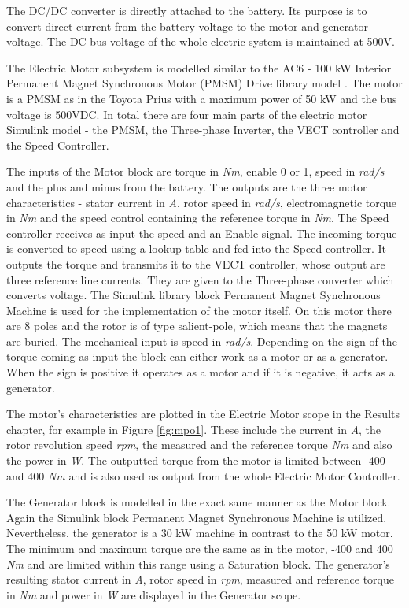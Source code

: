 The DC/DC converter is directly attached to the battery. Its purpose is to convert direct current from the battery voltage to the motor and generator voltage. The DC bus voltage of the whole electric system is maintained at 500V. 

The Electric Motor subsystem is modelled similar to the AC6 - 100 kW Interior Permanent Magnet Synchronous Motor (PMSM) Drive library model \citep{ac6Matlab}. The motor is a PMSM as in the Toyota Prius with a maximum power of 50 kW and the bus voltage is 500VDC. In total there are four main parts of the electric motor Simulink model - the PMSM, the Three-phase Inverter, the VECT controller and the Speed Controller. 

The inputs of the Motor block are torque in \textit{Nm}, enable 0 or 1, speed in \textit{rad/s} and the plus and minus from the battery. The outputs are the three motor characteristics - stator current in \textit{A}, rotor speed in \textit{rad/s}, electromagnetic torque in \textit{Nm} and the speed control containing the reference torque in \textit{Nm}. The Speed controller receives as input the speed and an Enable signal. The incoming torque is converted to speed using a lookup table and fed into the Speed controller. It outputs the torque and transmits it to the VECT controller, whose output are three reference line currents. They are given to the Three-phase converter which converts voltage. The Simulink library block Permanent Magnet Synchronous Machine \citep{pmsmMatlab} is used for the implementation of the motor itself. On this motor there are 8 poles and the rotor is of type salient-pole, which means that the magnets are buried. The mechanical input is speed in \textit{rad/s}. Depending on the sign of the torque coming as input the block can either work as a motor or as a generator. When the sign is positive it operates as a motor and if it is negative, it acts as a generator. 

The motor's characteristics are plotted in the Electric Motor scope in the Results chapter, for example in Figure \ref{fig:mpo1}. These include the current in \textit{A}, the rotor revolution speed \textit{rpm}, the measured and the reference torque \textit{Nm} and also the power in \textit{W}. The outputted torque from the motor is limited between -400 and 400 \textit{Nm} and is also used as output from the whole Electric Motor Controller.

The Generator block is modelled in the exact same manner as the Motor block. Again the Simulink block Permanent Magnet Synchronous Machine \citep{pmsmMatlab} is utilized. Nevertheless, the generator is a 30 kW machine in contrast to the 50 kW motor. The minimum and maximum torque are the same as in the motor, -400 and 400 \textit{Nm} and are limited within this range using a Saturation block. The generator's resulting stator current in \textit{A}, rotor speed in \textit{rpm}, measured and reference torque in \textit{Nm} and power in \textit{W} are displayed in the Generator scope.


